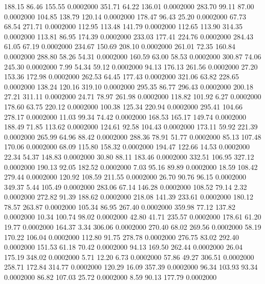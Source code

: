 188.15   86.46  155.55   0.0002000
 351.71   64.22  136.01   0.0002000
 283.70   99.11   87.00   0.0002000
 104.85  138.79  120.14   0.0002000
 178.47   96.43   25.20   0.0002000
  67.73   68.54  271.71   0.0002000
 112.95  113.48  141.79   0.0002000
 112.65  113.90  314.35   0.0002000
 113.81   86.95  174.39   0.0002000
 233.03  177.41  224.76   0.0002000
 284.43   61.05   67.19   0.0002000
 234.67  150.69  208.10   0.0002000
 261.01   72.35  160.84   0.0002000
 288.80   58.26   54.31   0.0002000
 160.59   63.00   58.53   0.0002000
 300.87   74.06  245.30   0.0002000
   7.99   54.34   59.12   0.0002000
  94.13  176.13  261.56   0.0002000
  27.20  153.36  172.98   0.0002000
 262.53   64.45  177.43   0.0002000
 321.06   63.82  228.65   0.0002000
 138.24  120.16  319.10   0.0002000
 295.35   86.77  296.43   0.0002000
 200.18   27.21  311.11   0.0002000
  24.71   78.97  261.98   0.0002000
 118.82  101.92    6.27   0.0002000
 178.60   63.75  220.12   0.0002000
 100.38  125.34  220.94   0.0002000
 295.41  104.66  278.17   0.0002000
  11.03   99.34   74.42   0.0002000
 168.53  165.17  149.74   0.0002000
 188.49   71.85  113.62   0.0002000
 124.61   92.58  104.43   0.0002000
 173.11   59.92  221.39   0.0002000
 265.99   64.96   88.42   0.0002000
 288.36   78.91   51.77   0.0002000
  85.13  107.48  170.06   0.0002000
  68.09  115.80  158.32   0.0002000
 194.47  122.66   14.53   0.0002000
  22.34   54.37  148.83   0.0002000
  30.80   88.11  183.46   0.0002000
 332.51  106.95  327.12   0.0002000
 190.13   92.05  182.52   0.0002000
   7.03   95.16   89.89   0.0002000
  18.59  108.42  279.44   0.0002000
 120.92  108.59  211.55   0.0002000
  26.70   90.76   96.15   0.0002000
 349.37    5.44  105.49   0.0002000
 283.06   67.14  146.28   0.0002000
 108.52   79.14    2.32   0.0002000
 272.82   91.39  188.62   0.0002000
 218.08  141.39  233.61   0.0002000
 180.12   78.57  263.87   0.0002000
 105.34   86.95  267.40   0.0002000
 359.98   77.12  137.82   0.0002000
  10.34  100.74   98.02   0.0002000
  42.80   41.71  235.57   0.0002000
 178.61   61.20   19.77   0.0002000
 164.37    3.34  306.06   0.0002000
 270.40   68.02  269.56   0.0002000
  58.19  170.22  106.04   0.0002000
 112.80   91.75  278.78   0.0002000
 276.75   83.02  292.40   0.0002000
 151.53   61.18   70.42   0.0002000
  94.13  169.50  262.44   0.0002000
  26.04  175.19  348.02   0.0002000
   5.71   12.20    6.73   0.0002000
  57.86   49.27  306.51   0.0002000
 258.71  172.84  314.77   0.0002000
 120.29   16.09  357.39   0.0002000
  96.34  103.93   93.34   0.0002000
  86.82  107.03   25.72   0.0002000
   8.59   90.13  177.79   0.0002000
